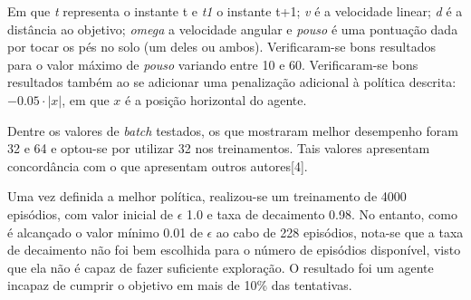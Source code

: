\documentclass[letterpaper, 10 pt, conference]{ieeeconf}  %
\begin{document}
Em que \emph{t} representa o instante t e \emph{t1} o instante t+1; \emph{v} é a velocidade linear; \emph{d} é a distância ao objetivo; \emph{omega} a velocidade angular e \emph{pouso} é uma pontuação dada por tocar os pés no solo (um deles ou ambos). 
Verificaram-se bons resultados para o valor máximo de \emph{pouso} variando entre 10 e 60. Verificaram-se bons resultados também ao se adicionar uma penalização adicional à política descrita: $-0.05\cdot|x|$, em que $x$ é a posição horizontal do agente. 

Dentre os valores de \emph{batch} testados, os que mostraram melhor desempenho foram 32 e 64 e optou-se por utilizar 32 nos treinamentos. Tais valores apresentam concordância com o que apresentam outros autores[4]. 

Uma vez definida a melhor política, realizou-se um treinamento de 4000 episódios, com valor inicial de $\epsilon$ 1.0 e taxa de decaimento 0.98. 
No entanto, como é alcançado o valor mínimo 0.01 de $\epsilon$ ao cabo de 228 episódios, nota-se que a taxa de decaimento não foi bem escolhida para o número de episódios disponível, visto que ela não é capaz de fazer suficiente exploração. O resultado foi um agente incapaz de cumprir o objetivo em mais de 10\% das tentativas. 
\end{document}
